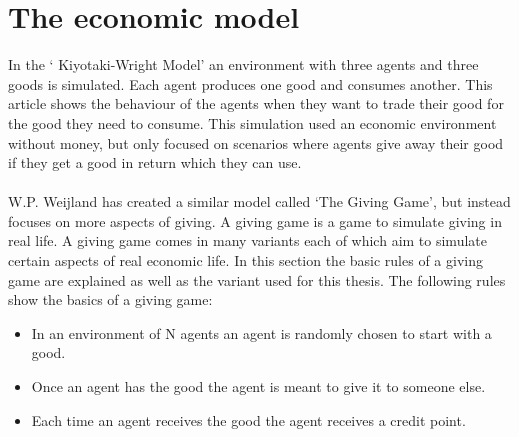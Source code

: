 \documentclass[twoside,openright]{uva-bachelor-thesis}
\begin{document}
\section{The economic model}
In the ‘ Kiyotaki-Wright Model’ an environment with three agents and three goods is simulated. Each agent produces one good and consumes another. This article shows the behaviour of the agents when they want to trade their good for the good they need to consume. This simulation used an economic environment without money, but only focused on scenarios where agents give away their good if they get a good in return which they can use. 
\\
\\
W.P. Weijland has created a similar model called ‘The Giving Game’, but instead focuses on more aspects of giving. A giving game is a game to simulate giving in real life. A giving game comes in many variants each of which aim to simulate certain aspects of real economic life. In this section the basic rules of a giving game are explained as well as the variant used for this thesis.
The following rules show the basics of a giving game:
\begin{itemize}
  \item In an environment of N agents an agent is randomly chosen to start with a good.
  \item Once an agent has the good the agent is meant to give it to someone else.
  \item Each time an agent receives the good the agent receives a credit point.
\end{itemize}
\end{document}
